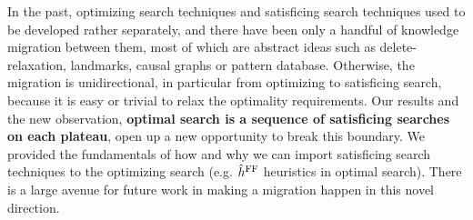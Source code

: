 
In the past, optimizing search techniques and satisficing search techniques used to be developed rather separately, and there have been only a handful of knowledge migration between them, most of which are abstract ideas such as delete-relaxation, landmarks, causal graphs or pattern database.
Otherwise, the migration is unidirectional, in particular from optimizing to satisficing search, because it is easy or trivial to relax the optimality requirements.
% 
Our results and the new observation, \textbf{optimal search is a sequence of satisficing searches on each plateau},
open up a new opportunity to break this boundary.  We provided the fundamentals of how and why we can import
satisficing search techniques to the optimizing search (e.g. $\hat{h}^{\text{FF}}$ heuristics in optimal search).  There is a
large avenue for future work in making a migration happen in this novel direction.

